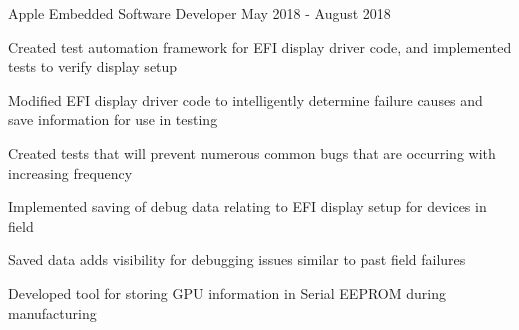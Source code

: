 

\begin{cventries}

  \cventry
    {Apple} %
    {Embedded Software Developer} %
    {May 2018 - August 2018} %
    {}
    {
      \begin{cvitems} %
        \item {Created test automation framework for EFI display driver code, and implemented tests to verify display setup}
        \item {Modified EFI display driver code to intelligently determine failure causes and save information for use in testing}
        \item {Created tests that will prevent numerous common bugs that are occurring with increasing frequency}
        \item {Implemented saving of debug data relating to EFI display setup for devices in field}
        \item {Saved data adds visibility for debugging issues similar to past field failures}
        \item {Developed tool for storing GPU information in Serial EEPROM during manufacturing}
      \end{cvitems}
    }


\end{cventries}

